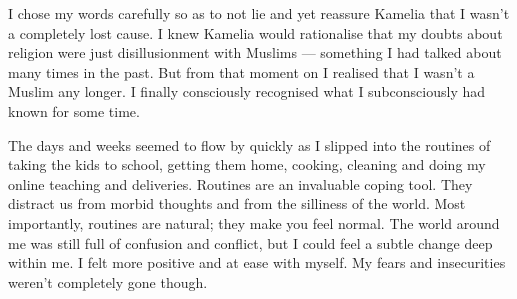 \documentclass[12pt]{memoir}
\begin{document}
I chose my words carefully so as to not lie and yet reassure Kamelia
that I wasn’t a completely lost cause.
I knew Kamelia would rationalise that my doubts about religion
were just disillusionment with Muslims —
something I had talked about many times in the past.
But from that moment on I realised that I wasn’t a Muslim any longer.
I finally consciously recognised what I subconsciously had known for some time.

The days and weeks seemed to flow by quickly as I slipped into the routines
of taking the kids to school, getting them home, cooking,
cleaning and doing my online teaching and deliveries.
Routines are an invaluable coping tool.
They distract us from morbid thoughts and from the silliness of the world.
Most importantly, routines are natural; they make you feel normal.
The world around me was still full of confusion and conflict,
but I could feel a subtle change deep within me.
I felt more positive and at ease with myself.
My fears and insecurities weren’t completely gone though.
\end{document}
